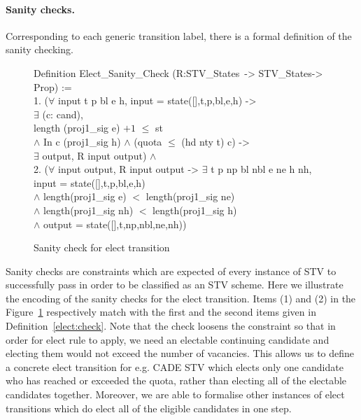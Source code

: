 \documentclass{llncs}
\begin{document}
\paragraph{Sanity checks.} 
Corresponding to each generic transition label, there is a formal definition of the sanity checking. 
\begin{scriptsize}
\begin{figure}[b]
{\selectfont
 Definition Elect\_Sanity\_Check (R:STV\_States~-> STV\_States-> Prop) :=\\
   1. ($\forall$ \textsf{input} t p bl e h, \textsf{input} = \textsf{state}([],t,p,bl,e,h) ->\\
    \hspace*{0.3cm} $\exists$ (c: cand),\\
    \hspace*{0.5cm} \textsf{length} (proj1\_sig e) $+ 1$  $\leq$ st \\
   \hspace*{0.5cm} $\wedge$ In c (proj1\_sig h) $\wedge$ (quota $\leq$ (hd nty t) c) -> \\
   \hspace*{1cm} $\exists$ \textsf{output}, R \textsf{input} \textsf{output}) $\wedge$\\
  2. ($\forall$ \textsf{input} \textsf{output}, R \textsf{input} \textsf{output} -> $\exists$ t p np bl nbl e ne h nh,\\
   \hspace*{0.3cm} \textsf{input} = \textsf{state}([],t,p,bl,e,h) \\
   \hspace*{0.45cm}$\wedge$ \textsf{length}(proj1\_sig e) $<$ \textsf{length}(proj1\_sig ne)\\ 
   \hspace*{0.45cm}$\wedge$ \textsf{length}(proj1\_sig nh) $<$ \textsf{length}(proj1\_sig h) \\
  \hspace*{0.5cm}$\wedge$ \textsf{output} = \textsf{state}([],t,np,nbl,ne,nh))
           
}
\caption{Sanity check for elect transition}
\label{fig;fig.2}
\end{figure}
\end{scriptsize}
Sanity checks are constraints which are expected of every instance
of STV to successfully pass in order to be classified as an STV
scheme. Here we illustrate the encoding of the sanity checks for the
elect transition. Items (1) and (2) in the Figure~\ref{fig;fig.2}
respectively match with the first and the second items given in
Definition~\ref{elect:check}. Note that the check loosens the
constraint so that in order for elect rule to apply, we need an
electable continuing candidate and electing them would not exceed
the number of vacancies. This allows us to define a concrete
elect transition for e.g. CADE STV \cite{DBLP:conf/cade/BeckertGS13} which elects only one candidate who has reached or exceeded the quota, rather than electing all of the electable candidates together. Moreover, we are able to formalise other instances of elect transitions which do elect all of the eligible candidates in one step. 
\end{document}
